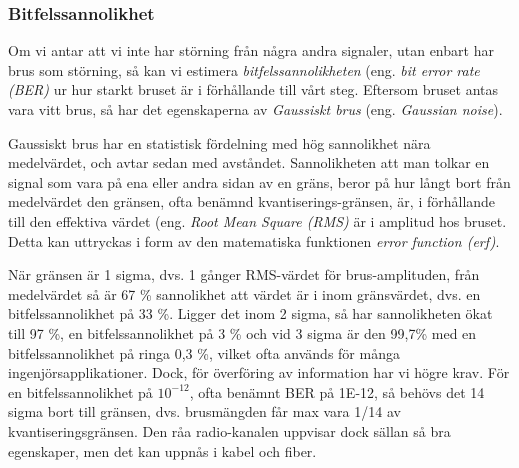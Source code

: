 \subsubsection{Bitfelssannolikhet}
\begin{rev-nytt}[MAD]

Om vi antar att vi inte har störning från några andra signaler, utan enbart har
brus som störning, så kan vi estimera \emph{bitfelssannolikheten} (eng.
\emph{bit error rate (BER)} ur hur starkt bruset är i förhållande till vårt
steg. Eftersom bruset antas vara vitt brus, så har det egenskaperna av
\emph{Gaussiskt brus} (eng. \emph{Gaussian noise}).

Gaussiskt brus har en statistisk fördelning med hög sannolikhet nära
medelvärdet, och avtar sedan med avståndet. Sannolikheten att man tolkar en
signal som vara på ena eller andra sidan av en gräns, beror på hur långt bort
från medelvärdet den gränsen, ofta benämnd kvantiserings-gränsen, är, i
förhållande till den effektiva värdet (eng. \emph{Root Mean Square (RMS)} är i
amplitud hos bruset. Detta kan uttryckas i form av den matematiska funktionen
\emph{error function (erf)}.

När gränsen är 1 sigma, dvs. 1 gånger RMS-värdet för brus-amplituden, från
medelvärdet så är 67 \% sannolikhet att värdet är i inom gränsvärdet, dvs. en
bitfelssannolikhet på 33 \%.
Ligger det inom 2 sigma, så har sannolikheten ökat till 97 \%, en
bitfelssannolikhet på 3 \% och vid 3 sigma är den 99,7\% med en
bitfelssannolikhet på ringa 0,3 \%, vilket ofta används för många
ingenjörsapplikationer. Dock, för överföring av information har vi högre krav.
För en bitfelssannolikhet på \(10^{-12}\), ofta benämnt BER på 1E-12, så
behövs det 14 sigma bort till gränsen, dvs. brusmängden får max vara 1/14 av
kvantiseringsgränsen. Den råa radio-kanalen uppvisar dock sällan så bra
egenskaper, men det kan uppnås i kabel och fiber.

\end{rev-nytt}

